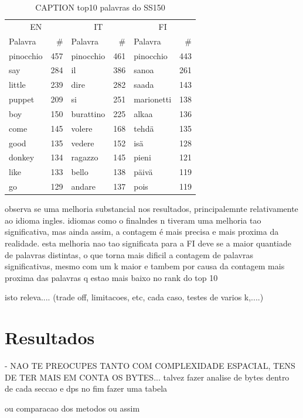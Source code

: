 \documentclass[mirror, portugues]{revdetua}
\begin{document}
\begin{table}[H]
\centering
\caption{CAPTION top10 palavras do SS150}
\label{table:top10_ss150}
\begin{tabular}{lr|lr|lr}
\toprule
\multicolumn{2}{c}{EN} & \multicolumn{2}{c}{IT} & \multicolumn{2}{c}{FI} \\
Palavra & \# & Palavra & \# & Palavra & \# \\
\midrule
pinocchio & 457 & pinocchio & 461 & pinocchio & 443 \\
say & 284 & il & 386 & sanoa & 261 \\
little & 239 & dire & 282 & saada & 143 \\
puppet & 209 & si & 251 & marionetti & 138 \\
boy & 150 & burattino & 225 & alkaa & 136 \\
come & 145 & volere & 168 & tehdä & 135 \\
good & 135 & vedere & 152 & isä & 128 \\
donkey & 134 & ragazzo & 145 & pieni & 121 \\
like & 133 & bello & 138 & päivä & 119 \\
go & 129 & andare & 137 & pois & 119 \\
\bottomrule
\end{tabular}
\end{table}

observa se uma melhoria substancial nos resultados, principalemnte relativamente ao idioma ingles. idiomas como o finalndes n tiveram uma melhoria tao significativa, mas ainda assim, a contagem é mais precisa e mais proxima da realidade. esta melhoria nao tao significata para a FI deve se a maior quantiade de palavras distintas, o que torna mais dificil a contagem de palavras significativas, mesmo com um k maior e tambem por causa da contagem mais proxima das palavras q estao mais baixo no rank do top 10

isto releva.... (trade off, limitacoes, etc, cada caso, testes de varios k,....)


\section{Resultados}

- NAO TE PREOCUPES TANTO COM COMPLEXIDADE ESPACIAL, TENS DE TER MAIS EM CONTA OS BYTES... talvez fazer analise de bytes dentro de cada seccao e dps no fim fazer uma tabela 

ou comparacao dos metodos ou assim
\end{document}
